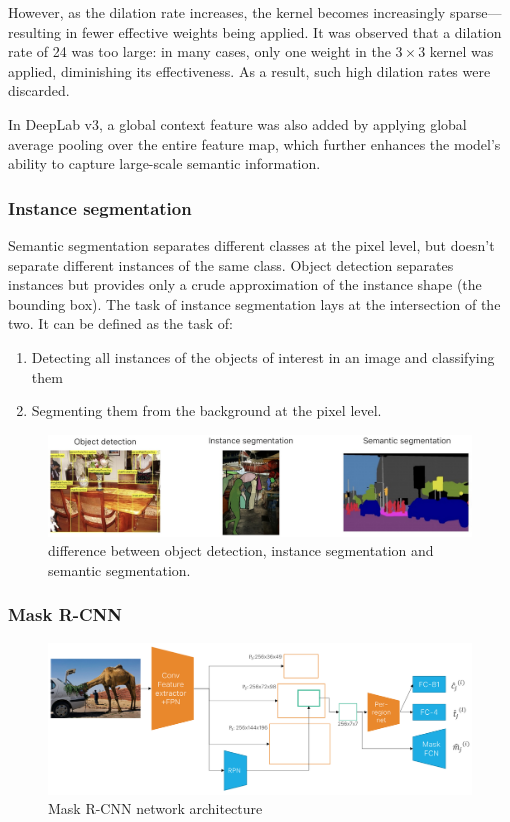 However, as the dilation rate increases, the kernel becomes increasingly sparse—resulting in fewer effective weights being applied. It was observed that a dilation rate of 24 was too large: in many cases, only one weight in the $3 \times 3$ kernel was applied, diminishing its effectiveness. As a result, such high dilation rates were discarded.

In DeepLab v3, a global context feature was also added by applying global average pooling over the entire feature map, which further enhances the model's ability to capture large-scale semantic information.

\subsubsection{Instance segmentation}
Semantic segmentation separates different classes at the pixel level, but doesn't separate different instances of the same class.
Object detection separates instances but provides only a crude approximation of the instance shape (the bounding box).
The task of instance segmentation lays at the intersection of the two. It can be defined as the task of:
\begin{enumerate}
  \item Detecting all instances of the objects of interest in an image and classifying them
  \item Segmenting them from the background at the pixel level.
\end{enumerate}

\begin{figure}[htbp]
  \centering
  \includegraphics[width=0.7\linewidth]{./img/instance_segmentation.jpg}
  \caption{difference between object detection, instance segmentation and semantic segmentation.}
\end{figure}

\subsubsection{Mask R-CNN}

\begin{figure}[htbp]
  \centering
  \includegraphics[width=0.8\linewidth]{./img/mask_rcnn.png}
  \caption{Mask R-CNN network architecture}
\end{figure}

